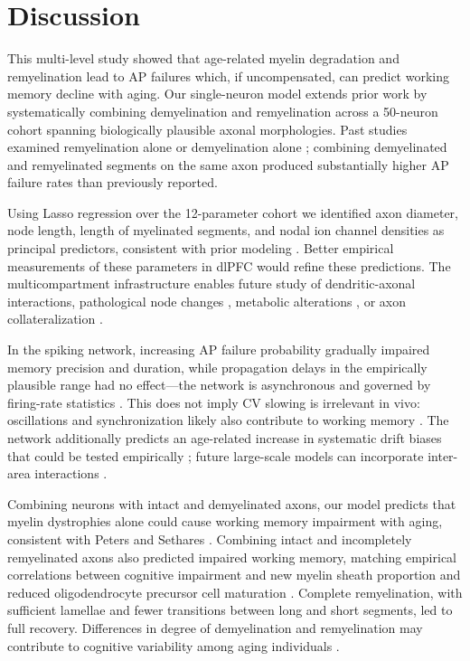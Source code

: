 \documentclass[11pt]{article}
\begin{document}
\section{Discussion}
This multi-level study showed that age-related myelin degradation and remyelination lead to AP failures which, if uncompensated, can predict working memory decline with aging. Our single-neuron model extends prior work by systematically combining demyelination and remyelination across a 50-neuron cohort spanning biologically plausible axonal morphologies. Past studies examined remyelination alone \cite{scurfield2018diameter} or demyelination alone \cite{stephanova2005compartmental,stephanova2008differences,naud2019linking,lasiene2008myelination,powers2012remyelination}; combining demyelinated and remyelinated segments on the same axon produced substantially higher AP failure rates than previously reported.

Using Lasso regression over the 12-parameter cohort we identified axon diameter, node length, length of myelinated segments, and nodal ion channel densities as principal predictors, consistent with prior modeling \cite{goldman1968computation,moore1978simulations,babbs2013subtle,young2013electrical,schmidt2019knosche}. Better empirical measurements of these parameters in dlPFC would refine these predictions. The multicompartment infrastructure enables future study of dendritic-axonal interactions, pathological node changes \cite{arancibia2014node}, metabolic alterations \cite{gerevich2023metabolic}, or axon collateralization \cite{sengupta2023axon}.

In the spiking network, increasing AP failure probability gradually impaired memory precision and duration, while propagation delays in the empirically plausible range had no effect---the network is asynchronous and governed by firing-rate statistics \cite{vanvreeswijk1996chaos,hansel2013shortterm}. This does not imply CV slowing is irrelevant in vivo: oscillations and synchronization likely also contribute to working memory \cite{gregoriou2009longrange,liebe2012theta,buschman2012synchronous,salazar2012content}. The network additionally predicts an age-related increase in systematic drift biases that could be tested empirically \cite{panichello2019errorcorrecting,bae2021bias,stein2021delaydependent}; future large-scale models can incorporate inter-area interactions \cite{leavitt2017sustained,christophel2017distributed,mejias2022mechanisms}.

Combining neurons with intact and demyelinated axons, our model predicts that myelin dystrophies alone could cause working memory impairment with aging, consistent with Peters and Sethares \cite{peters2002effects}. Combining intact and incompletely remyelinated axons also predicted impaired working memory, matching empirical correlations between cognitive impairment and new myelin sheath proportion \cite{peters2003effects} and reduced oligodendrocyte precursor cell maturation \cite{dimovasili2022aging}. Complete remyelination, with sufficient lamellae and fewer transitions between long and short segments, led to full recovery. Differences in degree of demyelination and remyelination may contribute to cognitive variability among aging individuals \cite{lacreuse2005cognitive,moss2007recognition}.
\end{document}
